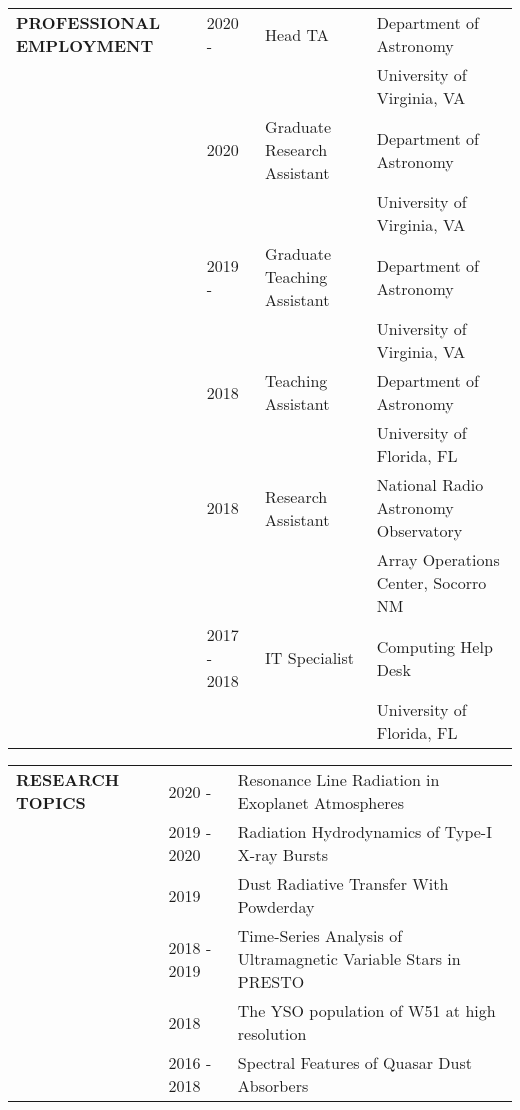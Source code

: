 \documentclass{article}
\begin{document}
\vspace{0.5cm}
\begin{tabular}{p{4cm}p{2.2cm}ll}
    \large{\textbf{PROFESSIONAL EMPLOYMENT}}
    &2020 - & Head TA            & Department of Astronomy \vspace{-0.45cm} \\
    &       &                    & \small University of Virginia, VA \vspace{0.125cm} \\ 
    &2020   & Graduate Research Assistant & Department of Astronomy \\
    &       &                    & \small University of Virginia, VA \vspace{0.125cm} \\ 
    &2019 - & Graduate Teaching Assistant & Department of Astronomy \\
    &       &                    & \small University of Virginia, VA \vspace{0.125cm} \\ 
    &2018   & Teaching Assistant & Department of Astronomy \\
    &       &                    & \small University of Florida, FL \vspace{0.125cm} \\ 
    &2018   & Research Assistant & National Radio Astronomy Observatory \\
    &       &                    & \small Array Operations Center, Socorro NM \vspace{0.125cm} \\ 
    &2017 - 2018 & IT Specialist & Computing Help Desk \\
    &       &                    & \small University of Florida, FL \vspace{0.125cm} \\ 
\end{tabular}
\vspace{0.5cm}





\begin{tabular}{p{4cm}p{2.2cm}l}
    \large{\textbf{RESEARCH \newline TOPICS}}&2020 - & Resonance Line Radiation in Exoplanet Atmospheres \vspace{-0.45cm}\\
    &2019 - 2020& Radiation Hydrodynamics of Type-I X-ray Bursts\\
    &2019 & Dust Radiative Transfer With Powderday \\
    &2018 - 2019 & Time-Series Analysis of Ultramagnetic Variable Stars in PRESTO\\
    &2018 & The YSO population of W51 at high resolution \\
    &2016 - 2018 & Spectral Features of Quasar Dust Absorbers \\
\end{tabular}
\vspace{0.5cm}
\end{document}
